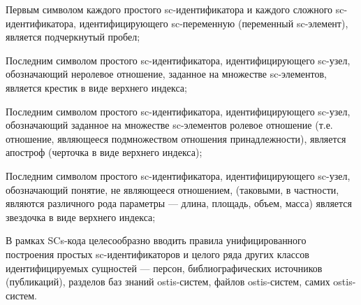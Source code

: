 {\begin{scnitemize}
    \item Первым символом каждого простого sc-идентификатора и каждого сложного sc-идентификатора, идентифицирующего sc-переменную (переменный sc-элемент), является подчеркнутый пробел;
    \item Последним символом простого sc-идентификатора, идентифицирующего sc-узел, обозначающий неролевое отношение, заданное на множестве sc-элементов, является крестик в виде верхнего индекса;
    \item Последним символом простого sc-идентификатора, идентифицирующего sc-узел, обозначающий заданное на множестве sc-элементов ролевое отношение (т.е. отношение, являющееся подмножеством отношения принадлежности), является апостроф (черточка в виде верхнего индекса);
    \item Последним символом простого sc-идентификатора, идентифицирующего sc-узел, обозначающий понятие, не являющееся отношением, (таковыми, в частности, являются различного рода параметры — длина, площадь, объем, масса) является звездочка в виде верхнего индекса;
    \item В рамках SCs-кода целесообразно вводить правила унифицированного построения простых sc-идентификаторов и целого ряда других классов идентифицируемых сущностей — персон, библиографических источников (публикаций), разделов баз знаний ostis-систем, файлов ostis-систем, самих ostis-систем.
\end{scnitemize}}



